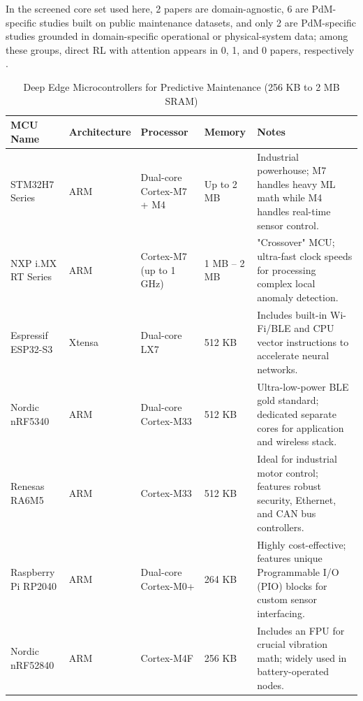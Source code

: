 \documentclass[sn-basic]{sn-jnl} %
\begin{document}
In the screened core set used here, 2 papers are domain-agnostic, 6 are PdM-specific studies built on public maintenance datasets, and only 2 are PdM-specific studies grounded in domain-specific operational or physical-system data; among these groups, direct RL with attention appears in 0, 1, and 0 papers, respectively \cite{DulacArnold2021,GarauLuis2021,Zhao2024,Aglogallos2026,Siraskar2025,Andrade2021Aircraft,Dangut2022RareFailure,Chen2024DigitalTwin}.


\begin{table}[htbp]
	\centering
	\caption{Deep Edge Microcontrollers for Predictive Maintenance (256 KB to 2 MB SRAM)}
	\label{tab:deep_edge_mcus}
	\renewcommand{\arraystretch}{1.3}
	\begin{tabular}{@{} l l l l p{5.5cm} @{}}
		\toprule
		\textbf{MCU Name} & \textbf{Architecture} & \textbf{Processor} & \textbf{Memory} & \textbf{Notes} \\
		\midrule
		STM32H7 Series & ARM & Dual-core Cortex-M7 + M4 & Up to 2 MB & Industrial powerhouse; M7 handles heavy ML math while M4 handles real-time sensor control. \\
		
		NXP i.MX RT Series & ARM & Cortex-M7 (up to 1 GHz) & 1 MB -- 2 MB & "Crossover" MCU; ultra-fast clock speeds for processing complex local anomaly detection. \\
		
		Espressif ESP32-S3 & Xtensa & Dual-core LX7 & 512 KB & Includes built-in Wi-Fi/BLE and CPU vector instructions to accelerate neural networks. \\
		
		Nordic nRF5340 & ARM & Dual-core Cortex-M33 & 512 KB & Ultra-low-power BLE gold standard; dedicated separate cores for application and wireless stack. \\
		
		Renesas RA6M5 & ARM & Cortex-M33 & 512 KB & Ideal for industrial motor control; features robust security, Ethernet, and CAN bus controllers. \\
		
		Raspberry Pi RP2040 & ARM & Dual-core Cortex-M0+ & 264 KB & Highly cost-effective; features unique Programmable I/O (PIO) blocks for custom sensor interfacing. \\
		
		Nordic nRF52840 & ARM & Cortex-M4F & 256 KB & Includes an FPU for crucial vibration math; widely used in battery-operated nodes. \\
		\bottomrule
	\end{tabular}
\end{table}
\end{document}
